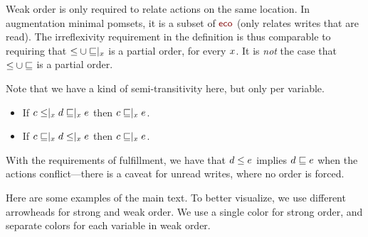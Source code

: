 Weak order is only required to relate actions on the same location.  In
augmentation minimal pomsets, it is a subset of $\reco$ (only relates writes
that are read).  The irreflexivity requirement in the definition is thus
comparable to requiring that ${\le}\cup{\mathrel{{\sqsubseteq}\mathbin{|}_{x}}}$ is a partial
order, for every $x$.  It is \emph{not} the case that ${\le}\cup{\sqsubseteq}$
is a partial order.

Note that we have a kind of semi-transitivity here, but only per variable.
\begin{itemize}
\item If $c\mathrel{{\le}\mathbin{|}_{x}}d\mathrel{{\sqsubseteq}\mathbin{|}_{x}}e$ then $c\mathrel{{\sqsubseteq}\mathbin{|}_{x}}e$.
\item If $c\mathrel{{\sqsubseteq}\mathbin{|}_{x}}d\mathrel{{\le}\mathbin{|}_{x}}e$ then $c\mathrel{{\sqsubseteq}\mathbin{|}_{x}}e$.
\end{itemize}
With the requirements of fulfillment, we have that $d\le e$ implies
$d\sqsubseteq e$ when the actions conflict---there is a caveat for unread
writes, where no order is forced.

Here are some examples of the main text.  To better visualize, we use
different arrowheads for strong and weak order.  We use a single color for
strong order, and separate colors for each variable in weak order.


